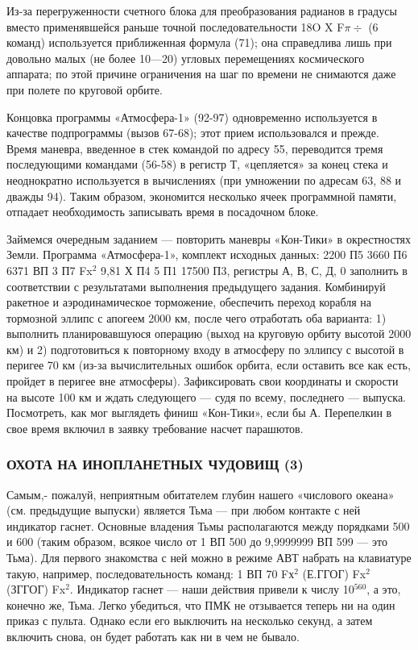 \documentclass[11pt,a4paper,oneside]{article}
\begin{document}
Из-за перегруженности счетного блока для преобразования радианов в градусы вместо применявшейся раньше точной последовательности 18O X F$\pi\div$ (6 команд) используется приближенная формула (71); она справедлива лишь при довольно малых (не более 10—20\degree) угловых перемещениях космического аппарата; по этой причине ограничения на шаг по времени не снимаются даже при полете по круговой орбите.

Концовка программы «Атмосфера-1» (92-97) одновременно используется в качестве подпрограммы (вызов 67-68); этот прием использовался и прежде. Время маневра, введенное в стек командой по адресу 55, переводится тремя последующими командами (56-58) в регистр Т, «цепляется» за конец стека и неоднократно используется в вычислениях (при умножении по адресам 63, 88 и дважды 94). Таким образом, экономится несколько ячеек программной памяти, отпадает необходимость записывать время в посадочном блоке.

Займемся очередным заданием — повторить маневры «Кон-Тики» в окрестностях Земли. Программа «Атмосфера-1», комплект исходных данных: 2200 П5 3660 П6 6371 ВП 3 П7 Fx$^{2}$ 9,81 Х П4 5 П1 17500 П3, регистры А, В, С, Д, 0 заполнить в соответствии с результатами выполнения предыдущего задания. Комбинируй ракетное и аэродинамическое торможение, обеспечить переход корабля на тормозной эллипс с апогеем 2000 км, после чего отработать оба варианта: 1) выполнить планировавшуюся операцию (выход на круговую орбиту высотой 2000 км) и 2) подготовиться к повторному входу в атмосферу по эллипсу с высотой в перигее 70 км (из-за вычислительных ошибок орбита, если оставить все как есть, пройдет в перигее вне атмосферы). Зафиксировать свои координаты и скорости на высоте 100 км и ждать следующего — судя по всему, последнего — выпуска. Посмотреть, как мог выглядеть финиш «Кон-Тики», если бы А. Перепелкин в свое время включил в заявку требование насчет парашютов.

\subsubsection{ОХОТА НА ИНОПЛАНЕТНЫХ ЧУДОВИЩ (3)}
Самым,- пожалуй, неприятным обитателем глубин нашего «числового океана» (см. предыдущие выпуски) является Тьма — при любом контакте с ней индикатор гаснет. Основные владения Тьмы располагаются между порядками 500 и 600 (таким образом, всякое число от 1 ВП 500 до 9,9999999 ВП 599 — это Тьма). Для первого знакомства с ней можно в режиме АВТ набрать на клавиатуре такую, например, последовательность команд: 1 ВП 70 Fх$^{2}$ (Е.ГГОГ) Fx$^{2}$ (ЗГГОГ) Fx$^{2}$. Индикатор гаснет — наши действия привели к числу 10$^{560}$, а это, конечно же, Тьма. Легко убедиться, что ПМК не отзывается теперь ни на один приказ с пульта. Однако если его выключить на несколько секунд, а затем включить снова, он будет работать как ни в чем не бывало.
\end{document}
